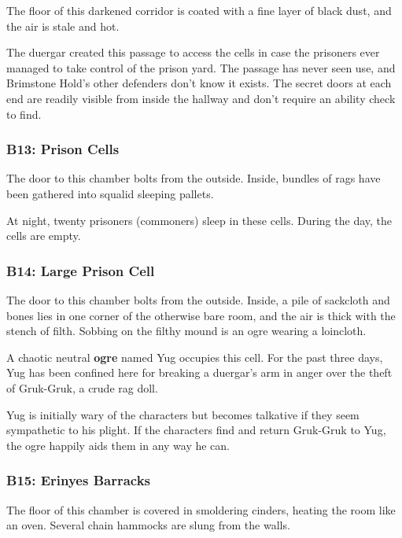 \documentclass[10pt,a4paper,twoside,bg=print,twocolumn,openany,nodeprecatedcode]{dndbook}
\begin{document}
\begin{DndReadAloud}{}
The floor of this darkened corridor is coated with a fine layer of black dust, and the air is stale and hot.

\end{DndReadAloud}

The duergar created this passage to access the cells in case the prisoners ever managed to take control of the prison yard. The passage has never seen use, and Brimstone Hold's other defenders don't know it exists. The secret doors at each end are readily visible from inside the hallway and don't require an ability check to find.

\subsubsection{B13: Prison Cells}
\begin{DndReadAloud}{}
The door to this chamber bolts from the outside. Inside, bundles of rags have been gathered into squalid sleeping pallets.

\end{DndReadAloud}

At night, twenty prisoners (commoners) sleep in these cells. During the day, the cells are empty.

\subsubsection{B14: Large Prison Cell}
\begin{DndReadAloud}{}
The door to this chamber bolts from the outside. Inside, a pile of sackcloth and bones lies in one corner of the otherwise bare room, and the air is thick with the stench of filth. Sobbing on the filthy mound is an ogre wearing a loincloth.

\end{DndReadAloud}

A chaotic neutral \textbf{ogre} named Yug occupies this cell. For the past three days, Yug has been confined here for breaking a duergar's arm in anger over the theft of Gruk-Gruk, a crude rag doll.

Yug is initially wary of the characters but becomes talkative if they seem sympathetic to his plight. If the characters find and return Gruk-Gruk to Yug, the ogre happily aids them in any way he can.

\subsubsection{B15: Erinyes Barracks}
\begin{DndReadAloud}{}
The floor of this chamber is covered in smoldering cinders, heating the room like an oven. Several chain hammocks are slung from the walls.

\end{DndReadAloud}
\end{document}
